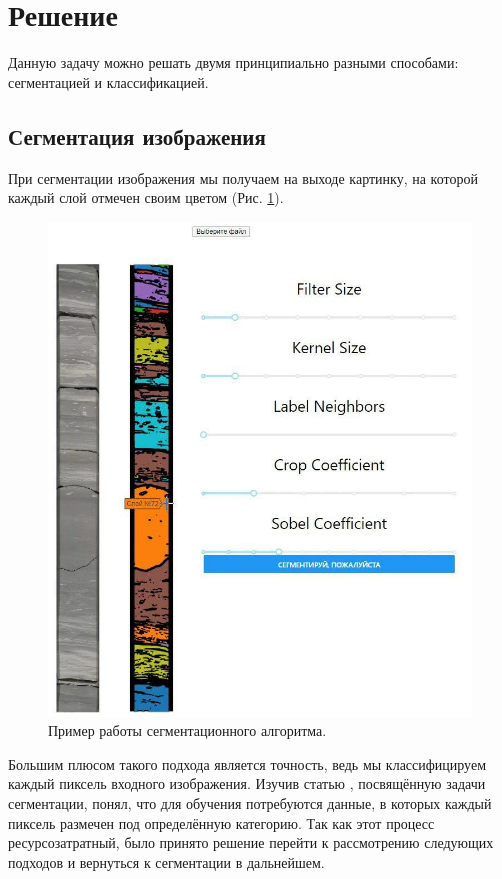 \documentclass[14pt]{matmex-diploma}
\begin{document}
\section{Решение}
    
    Данную задачу можно решать двумя принципиально разными способами: сегментацией и классификацией.

    \subsection{Сегментация изображения}
    
        При сегментации изображения мы получаем на выходе картинку, на которой каждый слой отмечен своим цветом (Рис. \ref{segmentation}). 
        
        \begin{figure}[h]
            \centering
            \includegraphics[scale=0.35]{images/segmentation.jpg}
            \caption{Пример работы сегментационного алгоритма.}
            \label{segmentation}
        \end{figure}
        
        Большим плюсом такого подхода является точность, ведь мы классифицируем каждый пиксель входного изображения. Изучив статью \cite{paper:segmentation}, посвящённую задачи сегментации, понял, что для обучения потребуются данные, в которых каждый пиксель размечен под определённую категорию. Так как этот процесс ресурсозатратный, было принято решение перейти к рассмотрению следующих подходов и вернуться к сегментации в дальнейшем.
    
\end{document}
